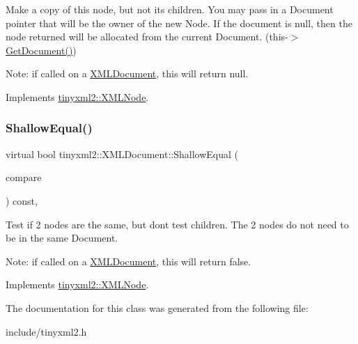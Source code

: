 Make a copy of this node, but not its children. You may pass in a Document pointer that will be the owner of the new Node. If the \textquotesingle{}document\textquotesingle{} is null, then the node returned will be allocated from the current Document. (this-\/$>$\mbox{\hyperlink{classtinyxml2_1_1XMLNode_af343d1ef0b45c0020e62d784d7e67a68}{Get\+Document()}})

Note\+: if called on a \mbox{\hyperlink{classtinyxml2_1_1XMLDocument}{X\+M\+L\+Document}}, this will return null. 

Implements \mbox{\hyperlink{classtinyxml2_1_1XMLNode_a8402cbd3129d20e9e6024bbcc0531283}{tinyxml2\+::\+X\+M\+L\+Node}}.

\mbox{\label{classtinyxml2_1_1XMLDocument_a6fe5ef18699091844fcf64b56ffa5bf9}} 
\subsubsection{\texorpdfstring{ShallowEqual()}{ShallowEqual()}}
{\footnotesize\ttfamily virtual bool tinyxml2\+::\+X\+M\+L\+Document\+::\+Shallow\+Equal (\begin{DoxyParamCaption}\item[{const \mbox{\hyperlink{classtinyxml2_1_1XMLNode}{X\+M\+L\+Node}} $\ast$}]{compare }\end{DoxyParamCaption}) const\hspace{0.3cm}{\ttfamily [inline]}, {\ttfamily [virtual]}}

Test if 2 nodes are the same, but don\textquotesingle{}t test children. The 2 nodes do not need to be in the same Document.

Note\+: if called on a \mbox{\hyperlink{classtinyxml2_1_1XMLDocument}{X\+M\+L\+Document}}, this will return false. 

Implements \mbox{\hyperlink{classtinyxml2_1_1XMLNode_a7ce18b751c3ea09eac292dca264f9226}{tinyxml2\+::\+X\+M\+L\+Node}}.



The documentation for this class was generated from the following file\+:\begin{DoxyCompactItemize}
\item 
include/tinyxml2.\+h\end{DoxyCompactItemize}
